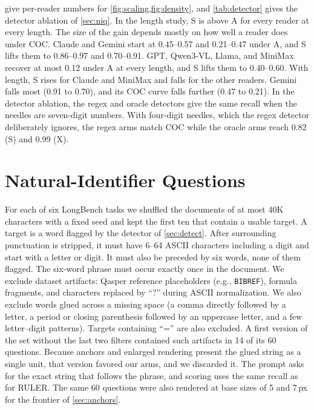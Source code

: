 give per-reader numbers for \cref{fig:scaling,fig:density}, and \cref{tab:detector} gives the detector ablation of \cref{sec:niq}.
In the length study, S is above A for every reader at every length.
The size of the gain depends mostly on how well a reader does under COC.
Claude and Gemini start at 0.45--0.57 and 0.21--0.47 under A, and S lifts them to 0.86--0.97 and 0.70--0.91.
GPT, Qwen3-VL, Llama, and MiniMax recover at most 0.12 under A at every length, and S lifts them to 0.40--0.60.
With length, S rises for Claude and MiniMax and falls for the other readers.
Gemini falls most (0.91 to 0.70), and its COC curve falls further (0.47 to 0.21).
In the detector ablation, the regex and oracle detectors give the same recall when the needles are seven-digit numbers.
With four-digit needles, which the regex detector deliberately ignores, the regex arms match COC while the oracle arms reach 0.82 (S) and 0.99 (X).





\section{Natural-Identifier Questions}
\label{app:niq}

For each of six LongBench tasks we shuffled the documents of at most 40K characters with a fixed seed and kept the first ten that contain a usable target.
A target is a word flagged by the detector of \cref{sec:detect}.
After surrounding punctuation is stripped, it must have 6--64 ASCII characters including a digit and start with a letter or digit.
It must also be preceded by six words, none of them flagged.
The six-word phrase must occur exactly once in the document.
We exclude dataset artifacts: Qasper reference placeholders (e.g., \texttt{BIBREF}), formula fragments, and characters replaced by ``?'' during ASCII normalization.
We also exclude words glued across a missing space (a comma directly followed by a letter, a period or closing parenthesis followed by an uppercase letter, and a few letter--digit patterns).
Targets containing ``='' are also excluded.
A first version of the set without the last two filters contained such artifacts in 14 of its 60 questions.
Because anchors and enlarged rendering present the glued string as a single unit, that version favored our arms, and we discarded it.
The prompt asks for the exact string that follows the phrase, and scoring uses the same recall as for RULER.
The same 60 questions were also rendered at base sizes of 5 and 7\,px for the frontier of \cref{sec:anchors}.

